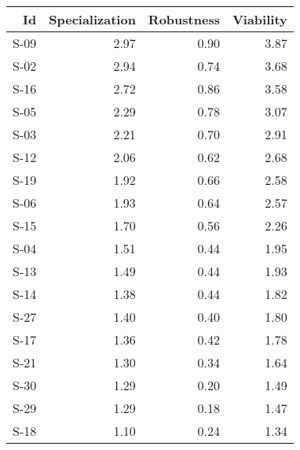\begin{tabular}{ | r | r | r | r | }
    \hline
                    Id  &  Specialization  &      Robustness  &       Viability  \\
    \hline
    \hline
                  S-09  &            2.97  &            0.90  &            3.87  \\
    \hline
                  S-02  &            2.94  &            0.74  &            3.68  \\
    \hline
                  S-16  &            2.72  &            0.86  &            3.58  \\
    \hline
                  S-05  &            2.29  &            0.78  &            3.07  \\
    \hline
                  S-03  &            2.21  &            0.70  &            2.91  \\
    \hline
                  S-12  &            2.06  &            0.62  &            2.68  \\
    \hline
                  S-19  &            1.92  &            0.66  &            2.58  \\
    \hline
                  S-06  &            1.93  &            0.64  &            2.57  \\
    \hline
                  S-15  &            1.70  &            0.56  &            2.26  \\
    \hline
                  S-04  &            1.51  &            0.44  &            1.95  \\
    \hline
                  S-13  &            1.49  &            0.44  &            1.93  \\
    \hline
                  S-14  &            1.38  &            0.44  &            1.82  \\
    \hline
                  S-27  &            1.40  &            0.40  &            1.80  \\
    \hline
                  S-17  &            1.36  &            0.42  &            1.78  \\
    \hline
                  S-21  &            1.30  &            0.34  &            1.64  \\
    \hline
                  S-30  &            1.29  &            0.20  &            1.49  \\
    \hline
                  S-29  &            1.29  &            0.18  &            1.47  \\
    \hline
                  S-18  &            1.10  &            0.24  &            1.34  \\

\end{tabular}
